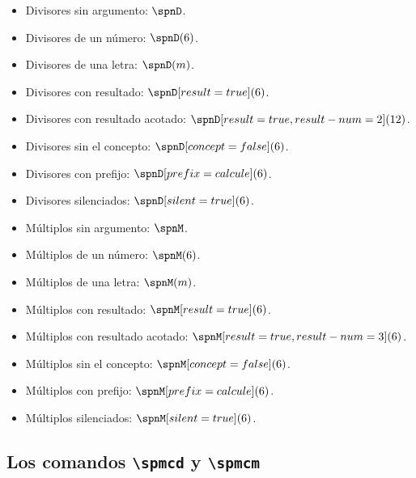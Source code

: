 \documentclass{article}
\begin{document}
\begin{itemize}
  \item Divisores sin argumento: $\spnD$.
  \item Divisores de un número: $\spnD(6)$.
  \item Divisores de una letra: $\spnD(m)$.
  \item Divisores con resultado: $\spnD[result=true](6)$.
  \item Divisores con resultado acotado: $\spnD[result=true,result-num=2](12)$.
  \item Divisores sin el concepto: $\spnD[concept=false](6)$.
  \item Divisores con prefijo: $\spnD[prefix={calcule}](6)$.
  \item Divisores silenciados: $\spnD[silent=true](6)$.
  \item Múltiplos sin argumento: $\spnM$.
  \item Múltiplos de un número: $\spnM(6)$.
  \item Múltiplos de una letra: $\spnM(m)$.
  \item Múltiplos con resultado: $\spnM[result=true](6)$.
  \item Múltiplos con resultado acotado: $\spnM[result=true,result-num=3](6)$.
  \item Múltiplos sin el concepto: $\spnM[concept=false](6)$.
  \item Múltiplos con prefijo: $\spnM[prefix={calcule}](6)$.
  \item Múltiplos silenciados: $\spnM[silent=true](6)$.
\end{itemize}

\subsection*{Los comandos \texttt{\textbackslash spmcd} y \texttt{\textbackslash spmcm}}
\end{document}
